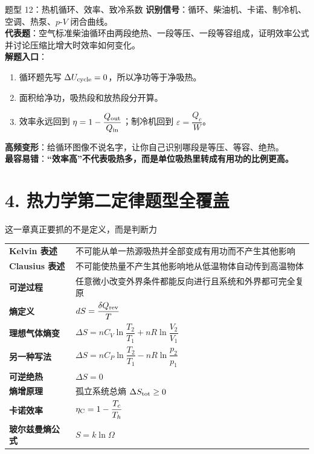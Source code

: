 \documentclass[11pt,a4paper]{ctexart}
\newcommand{\warn}[1]{\textcolor{red!70!black}{\textbf{#1}}}
\begin{document}
\begin{typebox}{题型 12：热机循环、效率、致冷系数}
\textbf{识别信号}：循环、柴油机、卡诺、制冷机、空调、热泵、\(p\)-\(V\) 闭合曲线。\\
\textbf{代表题}：空气标准柴油循环由两段绝热、一段等压、一段等容组成，证明效率公式并讨论压缩比增大时效率如何变化。\\
\textbf{解题入口}：
\begin{enumerate}
  \item 循环题先写 \(\Delta U_{\rm cycle}=0\)，所以净功等于净吸热。
  \item 面积给净功，吸热段和放热段分开算。
  \item 效率永远回到 \(\eta=1-\dfrac{Q_{\rm out}}{Q_{\rm in}}\)；制冷机回到 \(\varepsilon=\dfrac{Q_c}{W}\)。
\end{enumerate}
\textbf{高频变形}：给循环图像不说名字，让你自己识别哪段是等压、等容、绝热。\\
\textbf{最容易错}：\warn{“效率高”不代表吸热多，而是单位吸热里转成有用功的比例更高。}
\end{typebox}

\section*{4. 热力学第二定律题型全覆盖}

\begin{introbox}{这一章真正要抓的不是定义，而是判断力}
\begin{tabularx}{\textwidth}{>{\bfseries}p{4.0cm}X}
Kelvin 表述 & 不可能从单一热源吸热并全部变成有用功而不产生其他影响 \\[2pt]
Clausius 表述 & 不可能使热量不产生其他影响地从低温物体自动传到高温物体 \\[2pt]
可逆过程 & 任意微小改变外界条件都能反向进行且系统和外界都可完全复原 \\[2pt]
熵定义 & \(dS=\dfrac{\delta Q_{\rm rev}}{T}\) \\[2pt]
理想气体熵变 & \(\Delta S=nC_V\ln\dfrac{T_2}{T_1}+nR\ln\dfrac{V_2}{V_1}\) \\[2pt]
另一种写法 & \(\Delta S=nC_P\ln\dfrac{T_2}{T_1}-nR\ln\dfrac{p_2}{p_1}\) \\[2pt]
可逆绝热 & \(\Delta S=0\) \\[2pt]
熵增原理 & 孤立系统总熵 \(\Delta S_{\rm tot}\ge 0\) \\[2pt]
卡诺效率 & \(\eta_{\rm C}=1-\dfrac{T_c}{T_h}\) \\[2pt]
玻尔兹曼熵公式 & \(S=k\ln\Omega\)
\end{tabularx}
\end{introbox}
\end{document}
